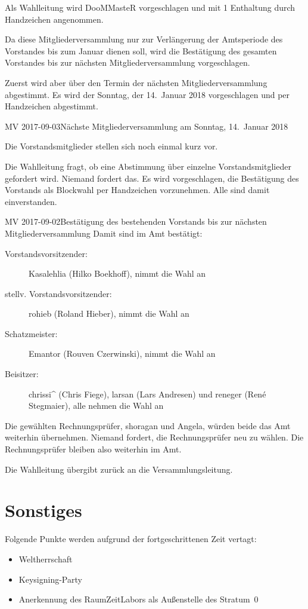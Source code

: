 \documentclass{s0minutes}
\begin{document}
Als Wahlleitung wird DooMMasteR vorgeschlagen und mit 1 Enthaltung durch
Handzeichen angenommen.

Da diese Mitgliederversammlung nur zur Verlängerung der Amtsperiode des
Vorstandes bis zum Januar dienen soll, wird die Bestätigung des gesamten
Vorstandes bis zur nächsten Mitgliederversammlung vorgeschlagen.

Zuerst wird aber über den Termin der nächsten Mitgliederversammlung abgestimmt.
Es wird der Sonntag, der 14.\ Januar 2018 vorgeschlagen und per Handzeichen
abgestimmt.

\begin{resolution}{MV 2017-09-03}{}{Nächste
  Mitgliederversammlung am Sonntag, 14.\ Januar 2018}{}
\end{resolution}

Die Vorstandsmitglieder stellen sich noch einmal kurz vor.

Die Wahlleitung fragt, ob eine Abstimmung über einzelne Vorstandsmitglieder
gefordert wird. Niemand fordert das. Es wird vorgeschlagen, die Bestätigung des
Vorstands als Blockwahl per Handzeichen vorzunehmen. Alle sind damit
einverstanden.

\begin{resolution}{MV 2017-09-02}{}{Bestätigung des
  bestehenden Vorstands bis zur nächsten Mitgliederversammlung}{}
  Damit sind im Amt bestätigt:
  \begin{description}
    \item[Vorstandsvorsitzender:] Kasalehlia (Hilko Boekhoff), nimmt die Wahl an
    \item[stellv. Vorstandsvorsitzender:] rohieb (Roland Hieber), nimmt die Wahl
      an
    \item[Schatzmeister:] Emantor (Rouven Czerwinski), nimmt die Wahl an
    \item[Beisitzer:] chrissi\^{} (Chris Fiege), larsan (Lars Andresen) und
      reneger (René Stegmaier), alle nehmen die Wahl an
  \end{description}
\end{resolution}

Die gewählten Rechnungsprüfer, shoragan und Angela, würden beide das Amt
weiterhin übernehmen. Niemand fordert, die Rechnungsprüfer neu zu wählen.
Die Rechnungsprüfer bleiben also weiterhin im Amt.

Die Wahlleitung übergibt zurück an die Versammlungsleitung.

\section{Sonstiges}

Folgende Punkte werden aufgrund der fortgeschrittenen Zeit vertagt:
\begin{itemize}
  \item Weltherrschaft
  \item Keysigning-Party
  \item Anerkennung des RaumZeitLabors als Außenstelle des Stratum~0
\end{itemize}

\end{document}
